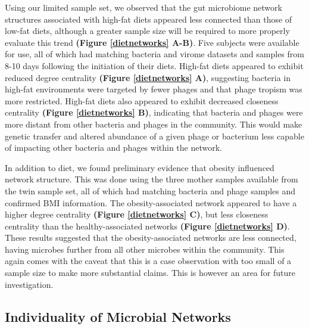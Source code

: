 \documentclass[12pt,]{article}
\begin{document}
Using our limited sample set, we observed that the gut microbiome
network structures associated with high-fat diets appeared less
connected than those of low-fat diets, although a greater sample size
will be required to more properly evaluate this trend \textbf{(Figure
\ref{dietnetworks} A-B)}. Five subjects were available for use, all of
which had matching bacteria and virome datasets and samples from 8-10
days following the initiation of their diets. High-fat diets appeared to
exhibit reduced degree centrality \textbf{(Figure \ref{dietnetworks}
A)}, suggesting bacteria in high-fat environments were targeted by fewer
phages and that phage tropism was more restricted. High-fat diets also
appeared to exhibit decreased closeness centrality \textbf{(Figure
\ref{dietnetworks} B)}, indicating that bacteria and phages were more
distant from other bacteria and phages in the community. This would make
genetic transfer and altered abundance of a given phage or bacterium
less capable of impacting other bacteria and phages within the network.

In addition to diet, we found preliminary evidence that obesity
influenced network structure. This was done using the three mother
samples available from the twin sample set, all of which had matching
bacteria and phage samples and confirmed BMI information. The
obesity-associated network appeared to have a higher degree centrality
\textbf{(Figure \ref{dietnetworks} C)}, but less closeness centrality
than the healthy-associated networks \textbf{(Figure \ref{dietnetworks}
D)}. These results suggested that the obesity-associated networks are
less connected, having microbes further from all other microbes within
the community. This again comes with the caveat that this is a case
observation with too small of a sample size to make more substantial
claims. This is however an area for future investigation.

\subsection{Individuality of Microbial
Networks}\label{individuality-of-microbial-networks}
\end{document}

